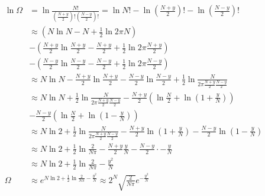 \documentclass{article}
\begin{document}
\begin{equation}
    \begin{split}
        \ln \Omega & = \ln \frac{N!}{\left(\frac{N + y}{2}\right)!\left(\frac{N - y}{2}\right)!} = \ln N! - \ln\left(\frac{N + y}{2}\right)! - \ln\left(\frac{N - y}{2}\right)! \\
        & \approx \left(N\ln N - N + \frac{1}{2}\ln 2\pi N\right) \\
        & - \left(\frac{N + y}{2}\ln \frac{N + y}{2} - \frac{N + y}{2} + \frac{1}{2}\ln 2\pi \frac{N + y}{2}\right) \\
        & - \left(\frac{N - y}{2}\ln \frac{N - y}{2} - \frac{N - y}{2} + \frac{1}{2}\ln 2\pi \frac{N - y}{2}\right) \\
        & \approx N\ln N - \frac{N + y}{2}\ln \frac{N + y}{2} - \frac{N - y}{2}\ln \frac{N - y}{2} + \frac{1}{2}\ln\frac{N}{2\pi\frac{N + y}{2}\frac{N - y}{2}} \\
        & \approx N\ln N+ \frac{1}{2}\ln\frac{N}{2\pi\frac{N + y}{2}\frac{N - y}{2}} - \frac{N + y}{2}\left(\ln\frac{N}{2} + \ln \left(1 + \frac{y}{N}\right)\right) \\ & - \frac{N - y}{2}\left(\ln\frac{N}{2} + \ln \left(1 - \frac{y}{N}\right)\right) \\
        & \approx N\ln 2+ \frac{1}{2}\ln\frac{N}{2\pi\frac{N + y}{2}\frac{N - y}{2}}  - \frac{N + y}{2}\ln \left(1 + \frac{y}{N}\right) - \frac{N - y}{2}\ln \left(1 - \frac{y}{N}\right) \\
        & \approx N\ln 2+ \frac{1}{2}\ln\frac{2}{N\pi}  - \frac{N + y}{2}\frac{y}{N} - \frac{N - y}{2} \cdot -\frac{y}{N} \\
        & \approx N\ln 2+ \frac{1}{2}\ln\frac{2}{N\pi} - \frac{y^2}{N} \\
        \Omega & \approx e^{N\ln 2+ \frac{1}{2}\ln\frac{2}{N\pi} - \frac{y^2}{N}} \approx 2^N\sqrt{\frac{2}{N\pi}}e^{- \frac{y^2}{N}}
    \end{split}
\end{equation}
\end{document}
